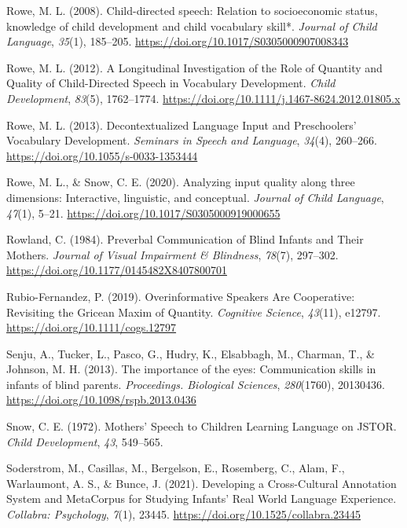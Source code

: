 \documentclass[
  man,floatsintext]{apa6}
\newlength{\cslhangindent}
\newlength{\cslentryspacingunit} %
\newenvironment{CSLReferences}[2] %
 {%
  \setlength{\parindent}{0pt}
  \ifodd #1
  \let\oldpar\par
  \def\par{\hangindent=\cslhangindent\oldpar}
  \fi
  \setlength{\parskip}{#2\cslentryspacingunit}
 }%
 {}
\begin{document}
\begin{CSLReferences}{1}{0}
\leavevmode{}%
Rowe, M. L. (2008). Child-directed speech: Relation to socioeconomic status, knowledge of child development and child vocabulary skill*. \emph{Journal of Child Language}, \emph{35}(1), 185--205. \url{https://doi.org/10.1017/S0305000907008343}

\leavevmode{}%
Rowe, M. L. (2012). A {Longitudinal Investigation} of the {Role} of {Quantity} and {Quality} of {Child-Directed Speech} in {Vocabulary Development}. \emph{Child Development}, \emph{83}(5), 1762--1774. \url{https://doi.org/10.1111/j.1467-8624.2012.01805.x}

\leavevmode{}%
Rowe, M. L. (2013). Decontextualized {Language Input} and {Preschoolers}' {Vocabulary Development}. \emph{Seminars in Speech and Language}, \emph{34}(4), 260--266. \url{https://doi.org/10.1055/s-0033-1353444}

\leavevmode{}%
Rowe, M. L., \& Snow, C. E. (2020). Analyzing input quality along three dimensions: Interactive, linguistic, and conceptual. \emph{Journal of Child Language}, \emph{47}(1), 5--21. \url{https://doi.org/10.1017/S0305000919000655}

\leavevmode{}%
Rowland, C. (1984). Preverbal {Communication} of {Blind Infants} and {Their Mothers}. \emph{Journal of Visual Impairment \& Blindness}, \emph{78}(7), 297--302. \url{https://doi.org/10.1177/0145482X8407800701}

\leavevmode{}%
Rubio-Fernandez, P. (2019). Overinformative {Speakers Are Cooperative}: {Revisiting} the {Gricean Maxim} of {Quantity}. \emph{Cognitive Science}, \emph{43}(11), e12797. \url{https://doi.org/10.1111/cogs.12797}

\leavevmode{}%
Senju, A., Tucker, L., Pasco, G., Hudry, K., Elsabbagh, M., Charman, T., \& Johnson, M. H. (2013). The importance of the eyes: Communication skills in infants of blind parents. \emph{Proceedings. Biological Sciences}, \emph{280}(1760), 20130436. \url{https://doi.org/10.1098/rspb.2013.0436}

\leavevmode{}%
Snow, C. E. (1972). Mothers' {Speech} to {Children Learning Language} on {JSTOR}. \emph{Child Development}, \emph{43}, 549--565.

\leavevmode{}%
Soderstrom, M., Casillas, M., Bergelson, E., Rosemberg, C., Alam, F., Warlaumont, A. S., \& Bunce, J. (2021). Developing a {Cross-Cultural Annotation System} and {MetaCorpus} for {Studying Infants}' {Real World Language Experience}. \emph{Collabra: Psychology}, \emph{7}(1), 23445. \url{https://doi.org/10.1525/collabra.23445}


\end{CSLReferences}
\end{document}
